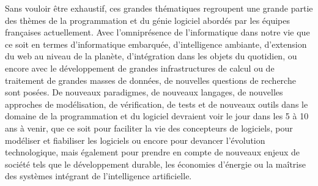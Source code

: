 \documentclass[11pt]{article}
\begin{document}
Sans vouloir être exhaustif, ces grandes thématiques regroupent une grande partie des
thèmes de la programmation et du génie logiciel abordés par les équipes
françaises actuellement. 
\noindent
Avec l'omniprésence de l'informatique dans notre vie que ce soit en termes
d'informatique embarquée, d'intelligence ambiante, d'extension du web au niveau
de la planète, d'intégration dans les objets du quotidien, ou encore avec le
développement de grandes infrastructures de calcul ou de traitement de grandes
masses de données, de nouvelles questions de recherche sont posées.
De nouveaux paradigmes, de nouveaux langages, de nouvelles approches de
modélisation, de vérification, de tests et de nouveaux outils dans le domaine
de la programmation et du logiciel devraient voir le jour dans les 5 à 10 ans à
venir, que ce soit pour faciliter la vie des concepteurs de logiciels, pour
modéliser et fiabiliser les logiciels ou encore pour devancer l'évolution
technologique, mais également pour prendre en compte de nouveaux enjeux de
société tels que le développement durable, les économies d'énergie ou la maîtrise des systèmes intégrant de l'intelligence artificielle.



\end{document}
